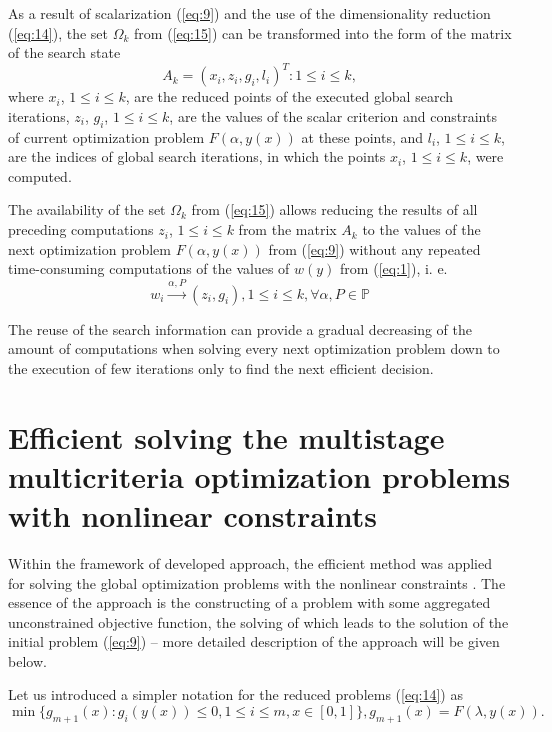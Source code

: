 \documentclass[runningheads]{llncs}
\begin{document}
As a result of scalarization (\ref{eq:9}) and the use of the dimensionality reduction (\ref{eq:14}), the set $\Omega_k$ from (\ref{eq:15}) can be transformed into the form of the matrix of the search state
\begin{equation}\label{eq:16}
	A_k={ (x_i,z_i,g_i,l_i )^T: 1\leq i \leq k },
\end{equation}
where $x_i$, $1\leq i\leq k$, are the reduced points of the executed global search iterations, $z_i$, $g_i$, $1\leq i\leq k$, are the values of the scalar criterion and constraints of current optimization problem $F(\alpha,y(x))$ at these points, and $l_i$, $1\leq i\leq k$, are the indices of global search iterations, in which the points $x_i$, $1\leq i\leq k$, were computed.

The availability of the set $\Omega_k$ from (\ref{eq:15}) allows reducing the results of all preceding computations $z_i$, $1\leq i\leq k$ from the matrix $A_k$ to the values of the next optimization problem $F(\alpha,y(x))$ from (\ref{eq:9}) without any repeated time-consuming computations of the values of $w(y)$ from (\ref{eq:1}), i. e.
\begin{equation}\label{eq:17}
	w_i \xrightarrow{\alpha,P} (z_i,g_i ), 1\leq i\leq k, \forall \alpha, P\in \mathbb{P}
\end{equation}

The reuse of the search information can provide a gradual decreasing of the amount of computations when solving every next optimization problem down to the execution of few iterations only to find the next efficient decision.

\section{Efficient solving the multistage multicriteria optimization problems with nonlinear constraints}	
\label{sec:05}
Within the framework of developed approach, the efficient method was applied for solving the global optimization problems with the nonlinear constraints \cite{c11}. The essence of the approach is the constructing of a problem with some aggregated unconstrained objective function, the solving of which leads to the solution of the initial problem (\ref{eq:9}) -- more detailed description of the approach will be given below.

Let us introduced a simpler notation for the reduced problems (\ref{eq:14}) as
\begin{equation}\label{eq:18}
	\min{\{g_{m+1} (x):g_i (y(x)) \leq 0, 1\leq i \leq m,x \in [0,1]\} }, g_{m+1} (x)=F(\lambda,y(x)).
\end{equation}
\end{document}
